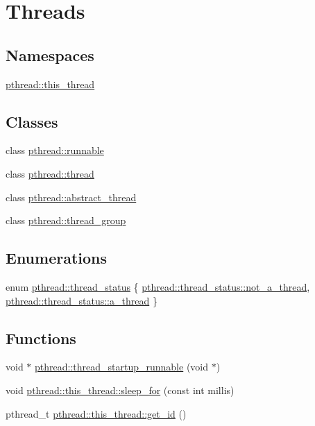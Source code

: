 \hypertarget{group__threads}{}\section{Threads}
\label{group__threads}
\subsection*{Namespaces}
\begin{DoxyCompactItemize}
\item 
 \hyperlink{namespacepthread_1_1this__thread}{pthread\+::this\+\_\+thread}
\end{DoxyCompactItemize}
\subsection*{Classes}
\begin{DoxyCompactItemize}
\item 
class \hyperlink{classpthread_1_1runnable}{pthread\+::runnable}
\item 
class \hyperlink{classpthread_1_1thread}{pthread\+::thread}
\item 
class \hyperlink{classpthread_1_1abstract__thread}{pthread\+::abstract\+\_\+thread}
\item 
class \hyperlink{classpthread_1_1thread__group}{pthread\+::thread\+\_\+group}
\end{DoxyCompactItemize}
\subsection*{Enumerations}
\begin{DoxyCompactItemize}
\item 
enum \hyperlink{group__threads_gac4b6e78f3d72c946ace7a92f3bec4101}{pthread\+::thread\+\_\+status} \{ \hyperlink{group__threads_ggac4b6e78f3d72c946ace7a92f3bec4101a8414cd8c988083af4eabb1311df873cf}{pthread\+::thread\+\_\+status\+::not\+\_\+a\+\_\+thread}, 
\hyperlink{group__threads_ggac4b6e78f3d72c946ace7a92f3bec4101a13b3689524b86ca2caaee82399099df1}{pthread\+::thread\+\_\+status\+::a\+\_\+thread}
 \}
\end{DoxyCompactItemize}
\subsection*{Functions}
\begin{DoxyCompactItemize}
\item 
void $\ast$ \hyperlink{group__threads_ga4ca2138b7b0d82d63a05c708edd45a6f}{pthread\+::thread\+\_\+startup\+\_\+runnable} (void $\ast$)
\item 
void \hyperlink{group__threads_ga01ae1b738d3d2dbbfe966b4aad07a0a9}{pthread\+::this\+\_\+thread\+::sleep\+\_\+for} (const int millis)
\item 
pthread\+\_\+t \hyperlink{group__threads_ga57275c7fa3dd5591c7f19ccf451f1fb6}{pthread\+::this\+\_\+thread\+::get\+\_\+id} ()
\end{DoxyCompactItemize}


